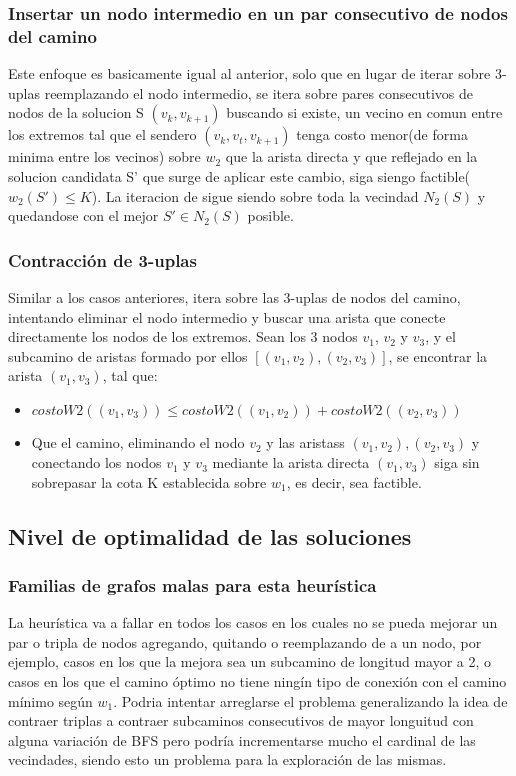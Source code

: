 \subsubsection{Insertar un nodo intermedio en un par consecutivo de nodos del camino}
Este enfoque es basicamente igual al anterior, solo que en lugar de iterar sobre 3-uplas reemplazando el nodo intermedio, se itera sobre pares consecutivos de nodos de la solucion S $(v_k, v_{k+1})$ buscando si existe, un vecino en comun entre los extremos tal que el sendero $(v_k, v_t, v_{k+1})$ tenga costo menor(de forma minima entre los vecinos) sobre $w_2$ que la arista directa y que reflejado en la solucion candidata S' que surge de aplicar este cambio, siga siengo factible($w_2(S') \leq K$). La iteracion de sigue siendo sobre toda la vecindad $N_2(S)$ y quedandose con el mejor $S' \in N_2(S)$ posible.


\subsubsection{Contracci\'on de 3-uplas}

Similar a los casos anteriores, itera sobre las 3-uplas de nodos del camino, intentando eliminar el nodo intermedio y buscar una arista que conecte directamente los nodos de los extremos. Sean los 3 nodos $v_1$, $v_2$ y $v_3$, y el subcamino de aristas formado por ellos $[ (v_1, v_2), (v_2, v_3)]$, se encontrar la arista $(v_1, v_3)$, tal que:

\begin{itemize}
	\item $costoW2((v_1, v_3)) \leq costoW2((v_1, v_2)) + costoW2((v_2, v_3))$
	\item Que el camino, eliminando el nodo $v_2$ y las aristass $(v_1, v_2), (v_2, v_3)$ y conectando los nodos $v_1$ y $v_3$ mediante la arista directa $(v_1, v_3)$ siga sin sobrepasar la cota K establecida sobre $w_1$, es decir, sea factible.
\end{itemize}

\subsection{Nivel de optimalidad de las soluciones}
\subsubsection{Familias de grafos malas para esta heur\'istica}

La heur\'istica va a fallar en todos los casos en los cuales no se pueda mejorar un par o tripla de nodos agregando, quitando o reemplazando de a un nodo, por ejemplo, casos en los que la mejora sea un subcamino de longitud mayor a 2, o casos en los que el camino \'optimo no tiene ning\'in tipo de conexi\'on con el camino m\'inimo seg\'un $w_1$. Podria intentar arreglarse el problema generalizando la idea de contraer triplas a contraer subcaminos consecutivos de mayor longuitud con alguna variaci\'on de BFS pero podr\'ia incrementarse mucho el cardinal de las vecindades, siendo esto un problema para la exploraci\'on de las mismas.

